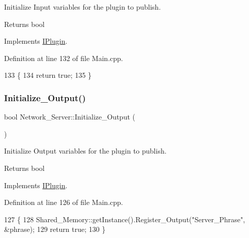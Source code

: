 Initialize Input variables for the plugin to publish. 

\begin{DoxyReturn}{Returns}
bool 
\end{DoxyReturn}


Implements \hyperlink{class_i_plugin_aa7c66743ad956d8ada57becee559af4d}{I\+Plugin}.



Definition at line 132 of file Main.\+cpp.


\begin{DoxyCode}
133 \{
134     \textcolor{keywordflow}{return} \textcolor{keyword}{true};
135 \}
\end{DoxyCode}
\mbox{\label{class_network___server_a9ddcc321be18d2a6c28f51a3b94983ff}} 
\subsubsection{\texorpdfstring{Initialize\+\_\+\+Output()}{Initialize\_Output()}}
{\footnotesize\ttfamily bool Network\+\_\+\+Server\+::\+Initialize\+\_\+\+Output (\begin{DoxyParamCaption}{ }\end{DoxyParamCaption})\hspace{0.3cm}{\ttfamily [virtual]}}



Initialize Output variables for the plugin to publish. 

\begin{DoxyReturn}{Returns}
bool 
\end{DoxyReturn}


Implements \hyperlink{class_i_plugin_a0b772513fc8c4ed01240e19c4bb84068}{I\+Plugin}.



Definition at line 126 of file Main.\+cpp.


\begin{DoxyCode}
127 \{
128     Shared\_Memory::getInstance().Register\_Output(\textcolor{stringliteral}{"Server\_Phrase"}, &phrase);
129     \textcolor{keywordflow}{return} \textcolor{keyword}{true};
130 \}
\end{DoxyCode}
\mbox{\label{class_network___server_a60edfbf13d3812f66381dca40fbe0801}} 
